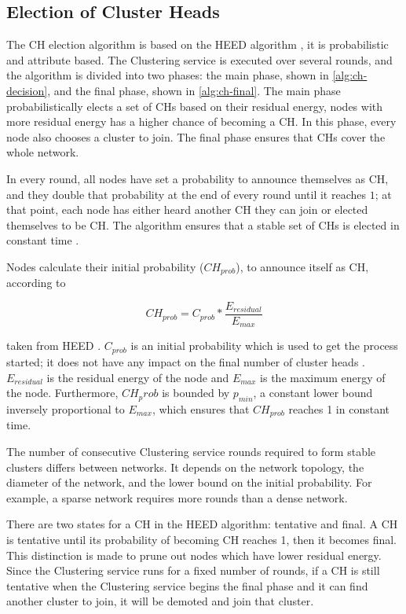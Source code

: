 \subsection{Election of Cluster Heads}
The CH election algorithm is based on the HEED algorithm \cite{Younis2004-HEED}, it is probabilistic and attribute based. The Clustering service is executed over several rounds, and the algorithm is divided into two phases: the main phase, shown in \cref{alg:ch-decision}, and the final phase, shown in \cref{alg:ch-final}. The main phase probabilistically elects a set of CHs based on their residual energy, nodes with more residual energy has a higher chance of becoming a CH. In this phase, every node also chooses a cluster to join. The final phase ensures that CHs cover the whole network.

In every round, all nodes have set a probability to announce themselves as CH, and they double that probability at the end of every round until it reaches $1$; at that point, each node has either heard another CH they can join or elected themselves to be CH. The algorithm ensures that a stable set of CHs is elected in constant time \cite{Younis2004-HEED}.

Nodes calculate their initial probability ($CH_{prob}$), to announce itself as CH, according to

\begin{equation}
    CH_{prob} = C_{prob} * \frac{E_{residual}}{E_{max}}
    \label{eq:ch-election-probability}
\end{equation}

taken from HEED \cite{Younis2004-HEED}. $C_{prob}$ is an initial probability which is used to get the process started; it does not have any impact on the final number of cluster heads \cite{Younis2004-HEED}. $E_{residual}$ is the residual energy of the node and $E_{max}$ is the maximum energy of the node. Furthermore, $CH_prob$ is bounded by $p_{min}$, a constant lower bound inversely proportional to $E_{max}$, which ensures that $CH_{prob}$ reaches 1 in constant time.

The number of consecutive Clustering service rounds required to form stable clusters differs between networks. It depends on the network topology, the diameter of the network, and the lower bound on the initial probability. For example, a sparse network requires more rounds than a dense network.

There are two states for a CH in the HEED algorithm: tentative and final. A CH is tentative until its probability of becoming CH reaches 1, then it becomes final. This distinction is made to prune out nodes which have lower residual energy. Since the Clustering service runs for a fixed number of rounds, if a CH is still tentative when the Clustering service begins the final phase and it can find another cluster to join, it will be demoted and join that cluster. 

